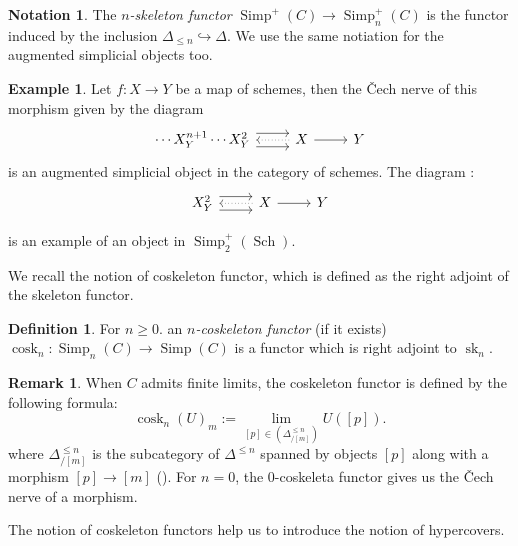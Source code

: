 \documentclass[a4paper]{amsart}
\theoremstyle{definition}
\newtheorem{definition}[theorem]{Definition}
\newtheorem{example}[theorem]{Example}
\newtheorem{remark}[theorem]{Remark}
\newtheorem{notation}[theorem]{Notation}
\begin{document}
\begin{notation}
    The \textit{$n$-skeleton functor} $\operatorname{Simp}^+(C) \to \operatorname{Simp}^+_n(C)$ is the functor induced by the inclusion $\Delta_{\le n} \hookrightarrow \Delta$. We use the same notiation for the augmented simplicial objects too.
\end{notation}
\begin{example}
    Let $f: X \to Y$ be a map of schemes, then the \v{C}ech nerve of this morphism given by the diagram
    \begin{equation}
        \begin{tikzcd}
            \cdots X^{n+1}_Y \cdots X^2_Y \arrow[r, shift right=2] \arrow[r,shift right=-2]  & X \arrow[l,dotted] \arrow[r] & Y 
        \end{tikzcd}
    \end{equation}
    is an augmented simplicial object in the category of schemes. The diagram :
    \begin{equation}
          \begin{tikzcd}
   X^2_Y \arrow[r, shift right=2] \arrow[r,shift right=-2]  & X \arrow[l,dotted] \arrow[r] & Y 
        \end{tikzcd}
    \end{equation}

 is an example of an object in $\operatorname{Simp}^+_2(\operatorname{Sch})$.
 \end{example}
We recall the notion of coskeleton functor, which is defined as the right adjoint of the skeleton functor.
\begin{definition}\cite[Definition 3.2]{conradcohmdescent}
    For $n \ge 0$. an \textit{$n$-coskeleton functor} (if it exists) $\operatorname{cosk}_n : \operatorname{Simp}_n(C) \to \operatorname{Simp}(C)$ is a functor which is right adjoint to $\operatorname{sk}_n$.
\end{definition}

\begin{remark}
    When $C$ admits finite limits, the coskeleton functor is defined by the following formula:
    \begin{equation}
        \operatorname{cosk}_n(U)_m := \operatorname{lim}_{[p] \in (\Delta^{\le n}_{/[m]})} U([p]).
    \end{equation}
    where $\Delta^{\le n}_{/[m]}$ is the subcategory of $\Delta^{\le n}$ spanned by objects $[p]$ along with a morphism $[p] \to [m]$ (\cite[\href{https://stacks.math.columbia.edu/tag/0183}{Tag 0183}]{stacks-project}). For $n=0$, the $0$-coskeleta functor gives us the \v{C}ech nerve of a morphism. 
\end{remark}
The notion of coskeleton functors help us to introduce the notion of hypercovers.
\end{document}
